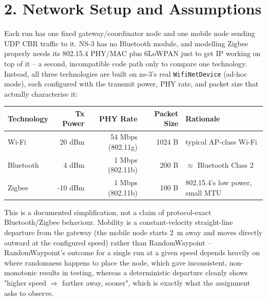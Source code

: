 \documentclass[11pt]{article}
\begin{document}
\section*{2. Network Setup and Assumptions}
Each run has one fixed gateway/coordinator node and one mobile node sending
UDP CBR traffic to it. NS-3 has no Bluetooth module, and modelling Zigbee
properly needs its 802.15.4 PHY/MAC plus 6LoWPAN just to get IP working on
top of it -- a second, incompatible code path only to compare one
technology. Instead, all three technologies are built on ns-3's real
\texttt{WifiNetDevice} (ad-hoc mode), each configured with the transmit
power, PHY rate, and packet size that actually characterise it:
\begin{center}
\renewcommand{\arraystretch}{1.2}
\begin{tabular}{lrrrl}
\toprule
\textbf{Technology} & \textbf{Tx Power} & \textbf{PHY Rate} & \textbf{Packet Size} & \textbf{Rationale} \\
\midrule
Wi-Fi     & 20 dBm  & 54 Mbps (802.11g) & 1024 B & typical AP-class Wi-Fi \\
Bluetooth & 4 dBm   & 1 Mbps (802.11b)  & 200 B  & $\approx$ Bluetooth Class 2 \\
Zigbee    & -10 dBm & 1 Mbps (802.11b)  & 100 B  & 802.15.4's low power, small MTU \\
\bottomrule
\end{tabular}
\end{center}
This is a documented simplification, not a claim of protocol-exact
Bluetooth/Zigbee behaviour. Mobility is a constant-velocity straight-line
departure from the gateway (the mobile node starts 2~m away and moves
directly outward at the configured speed) rather than RandomWaypoint --
RandomWaypoint's outcome for a single run at a given speed depends heavily
on where randomness happens to place the node, which gave inconsistent,
non-monotonic results in testing, whereas a deterministic departure cleanly
shows "higher speed $\Rightarrow$ farther away, sooner", which is exactly
what the assignment asks to observe.
\end{document}

